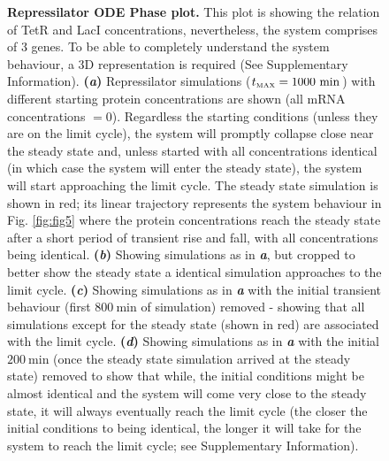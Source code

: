 \documentclass[runningheads,a4paper]{llncs}
\begin{document}
\begin{figure}
    \centering
    \singlespacing
    \noindent{}
    \vspace{-0.8cm}
    \caption{\textbf{Repressilator ODE Phase plot.} This plot is showing the relation of TetR and LacI concentrations, nevertheless, the system comprises of 3 genes. To be able to completely understand the system behaviour, a 3D representation is required (See Supplementary Information). \textbf{(\textit{a})} Repressilator simulations ($t_{\textrm{\tiny MAX}}=1000\ \textrm{min} $) with different starting protein concentrations are shown (all mRNA concentrations $= 0$). Regardless the starting conditions (unless they are on the limit cycle), the system will promptly collapse close near the steady state and, unless started with all concentrations identical (in which case the system will enter the steady state), the system will start approaching the limit cycle. The steady state simulation is shown in red; its linear trajectory represents the system behaviour in Fig. \ref{fig:fig5} where the protein concentrations reach the steady state after a short period of transient rise and fall, with all concentrations being identical. \textbf{(\textit{b})} Showing simulations as in \textit{\textbf{a}}, but cropped to better show the steady state a identical simulation approaches to the limit cycle. \textbf{(\textit{c})} Showing simulations as in \textit{\textbf{a}} with the initial transient behaviour (first $800\ \textrm{min}$ of simulation) removed - showing that all simulations except for the steady state (shown in red) are associated with the limit cycle. \textbf{(\textit{d})} Showing simulations as in \textit{\textbf{a}} with the initial $200\ \textrm{min}$ (once the steady state simulation arrived at the steady state) removed to show that while, the initial conditions might be almost identical and the system will come very close to the steady state, it will always eventually reach the limit cycle (the closer the initial conditions to being identical, the longer it will take for the system to reach the limit cycle; see Supplementary Information).}

\end{figure}
\end{document}
